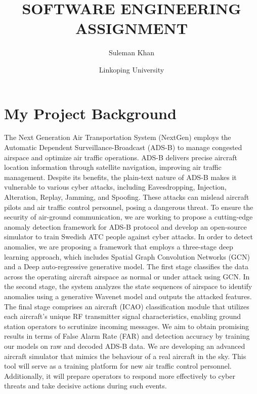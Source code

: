 \documentclass[11pt,journal,compsoc]{article}
\title{SOFTWARE ENGINEERING ASSIGNMENT}
\author{Suleman Khan}
\date{Linkoping University}
\begin{document}
\maketitle

\section{My Project Background }

The Next Generation Air Transportation System (NextGen) employs the Automatic Dependent Surveillance-Broadcast (ADS-B) to manage congested airspace and optimize air traffic operations. ADS-B delivers precise aircraft location information through satellite navigation, improving air traffic management. Despite its benefits, the plain-text nature of ADS-B makes it vulnerable to various cyber attacks, including Eavesdropping, Injection, Alteration, Replay, Jamming, and Spoofing. These attacks can mislead aircraft pilots and air traffic control personnel, posing a dangerous threat. To ensure the security of air-ground communication, we are working to propose a cutting-edge anomaly detection framework for ADS-B protocol and develop an open-source simulator to train Swedish ATC people against cyber attacks. In order to detect anomalies, we are proposing a framework that employs a three-stage deep learning approach, which includes Spatial Graph Convolution Networks (GCN) and a Deep auto-regressive generative model. The first stage classifies the data across the operating aircraft airspace as normal or under attack using GCN. In the second stage, the system analyzes the state sequences of airspace to identify anomalies using a generative Wavenet model and outputs the attacked features. The final stage comprises an aircraft (ICAO) classification module that utilizes each aircraft's unique RF transmitter signal characteristics, enabling ground station operators to scrutinize incoming messages. We aim to obtain promising results in terms of False Alarm Rate (FAR) and detection accuracy by training our models on raw and decoded ADS-B data. We are developing an advanced aircraft simulator that mimics the behaviour of a real aircraft in the sky. This tool will serve as a training platform for new air traffic control personnel. Additionally, it will prepare operators to respond more effectively to cyber threats and take decisive actions during such events.
\end{document}
